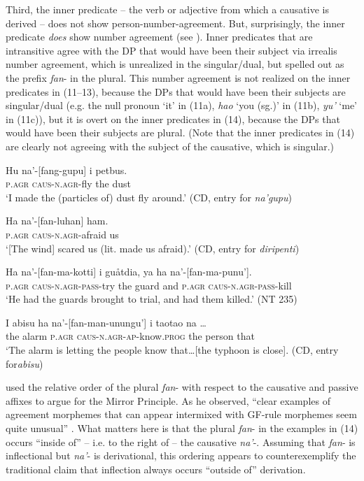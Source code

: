 \documentclass[output=paper,
modfonts
]{LSP/langsci}
\begin{document}
\begin{exe}
\begin{xlist}
Third, the inner predicate -- the verb or adjective from which a
causative is derived -- does not show person-number-agreement. But,
surprisingly, the inner predicate \emph{does} show number agreement (see
\citealt[112--114]{gibson1980}). Inner predicates that are intransitive agree with
the DP that would have been their subject via irrealis number agreement,
which is unrealized in the singular/dual, but spelled out as the prefix
\emph{fan}- in the plural. This number agreement is not realized on the
inner predicates in (11--13), because the DPs that would have been their
subjects are singular/dual (e.g. the null pronoun `it' in (11a),
\emph{hao} `you (sg.)' in (11b), \emph{yu'} `me' in (11c)), but it is
overt on the inner predicates in (14), because the DPs that would have
been their subjects are plural. (Note that the inner predicates in (14)
are clearly not agreeing with the subject of the causative, which is
singular.)

\begin{exe}
\ex \begin{xlist}
\ex
\gll  Hu na'-{[}fang-gupu{]} i petbus.\\
\textsc{p.agr} \textsc{caus-n.agr-}fly the dust\\
\glt `I made the (particles of) dust fly around.' (CD, entry for \emph{na'gupu})

\ex \gll Ha na'-{[}fan-luhan{]} ham.\\
\textsc{p.agr} \textsc{caus-n.agr-}afraid us\\
\glt `{[}The wind{]} scared us (lit. made us afraid).' (CD, entry for \emph{diripenti})

\ex \gll Ha na'-{[}fan-ma-kotti{]} i guåtdia, ya ha na'-{[}fan-ma-punu'{]}.\\
\textsc{p.agr} \textsc{caus-n.agr-pass-}try the guard and \textsc{p.agr} \textsc{caus-n.agr-pass-}kill\\
\glt `He had the guards brought to trial, and had them killed.' (NT 235)

\ex \gll I abisu ha na'-{[}fan-man-unungu'{]} i taotao na {\ldots}\\
the alarm \textsc{p.agr} \textsc{caus-n.agr-ap-}know.\textsc{prog} the person that\\
\glt `The alarm is letting the people know that{\dots}{[}the typhoon is close{]}.
(CD, entry for\emph{abisu})
\end{xlist}
\end{exe}

\citet{baker1985} used the relative order of the plural \emph{fan}- with
respect to the causative and passive affixes to argue for the Mirror
Principle. As he observed, ``clear examples of agreement morphemes that
can appear intermixed with GF-rule morphemes seem quite unusual'' \citep[386]{baker1985}. What matters here is that the plural \emph{fan}- in the examples
in (14) occurs ``inside of'' -- i.e. to the right of -- the causative
\emph{na'}-. Assuming that \emph{fan}- is inflectional but \emph{na'}-
is derivational, this ordering appears to counterexemplify the
traditional claim that inflection always occurs ``outside of''
derivation.


\end{xlist}
\end{exe}
\end{document}
